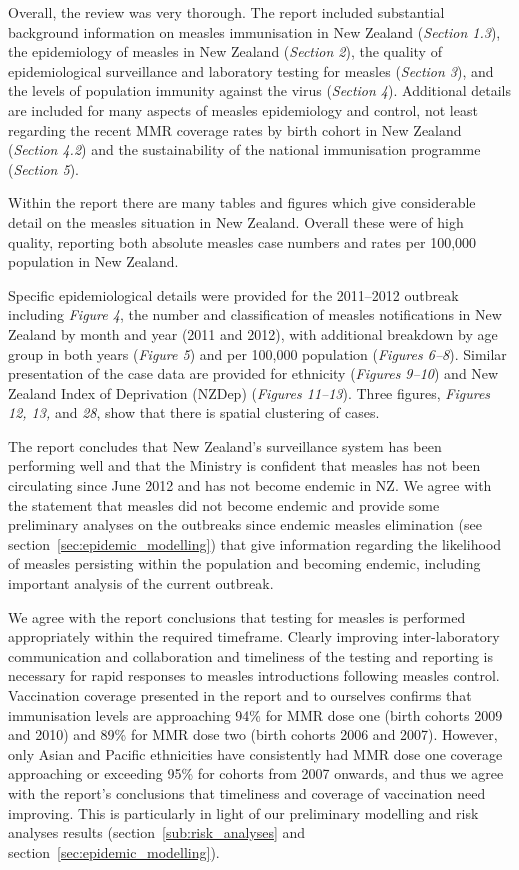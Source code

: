 \documentclass{article}
\begin{document}
Overall, the review was very thorough. The report included substantial background information on measles immunisation in New Zealand (\emph{Section 1.3}), the epidemiology of measles in New Zealand (\emph{Section 2}), the quality of epidemiological surveillance and laboratory testing for measles (\emph{Section 3}), and the levels of population immunity against the virus (\emph{Section 4}). Additional details are included for many aspects of measles epidemiology and control, not least regarding the recent MMR coverage rates by birth cohort in New Zealand (\emph{Section 4.2}) and the sustainability of the national immunisation programme (\emph{Section 5}).

Within the report there are many tables and figures which give considerable detail on the measles situation in New Zealand. Overall these were of high quality, reporting both absolute measles case numbers and rates per 100,000 population in New Zealand.

Specific epidemiological details were provided for the 2011--2012 outbreak including \emph{Figure 4}, the number and classification of measles notifications in New Zealand by month and year (2011 and 2012), with additional breakdown by age group in both years (\emph{Figure 5}) and per 100,000 population (\emph{Figures 6--8}). Similar presentation of the case data are provided for ethnicity (\emph{Figures 9--10}) and New Zealand Index of Deprivation (NZDep) (\emph{Figures 11--13}). Three figures, \emph{Figures 12, 13,} and \emph{28}, show that there is spatial clustering of cases.

The report concludes that New Zealand's surveillance system has been performing well and that the Ministry is confident that measles has not been circulating since June 2012 and has not become endemic in NZ. We agree with the statement that measles did not become endemic and provide some preliminary analyses on the outbreaks since endemic measles elimination (see section~\ref{sec:epidemic_modelling}) that give information regarding the likelihood of measles persisting within the population and becoming endemic, including important analysis of the current outbreak.

We agree with the report conclusions that testing for measles is performed appropriately within the required timeframe. Clearly improving inter-laboratory communication and collaboration and timeliness of the testing and reporting is necessary for rapid responses to measles introductions following measles control. Vaccination coverage presented in the report and to ourselves confirms that immunisation levels are approaching 94\% for MMR dose one (birth cohorts 2009 and 2010) and 89\% for MMR dose two (birth cohorts 2006 and 2007). However, only Asian and Pacific ethnicities have consistently had MMR dose one coverage approaching or exceeding 95\% for cohorts from 2007 onwards, and thus we agree with the report's conclusions that timeliness and coverage of vaccination need improving. This is particularly in light of our preliminary modelling and risk analyses results (section~\ref{sub:risk_analyses} and section~\ref{sec:epidemic_modelling}).
\end{document}
